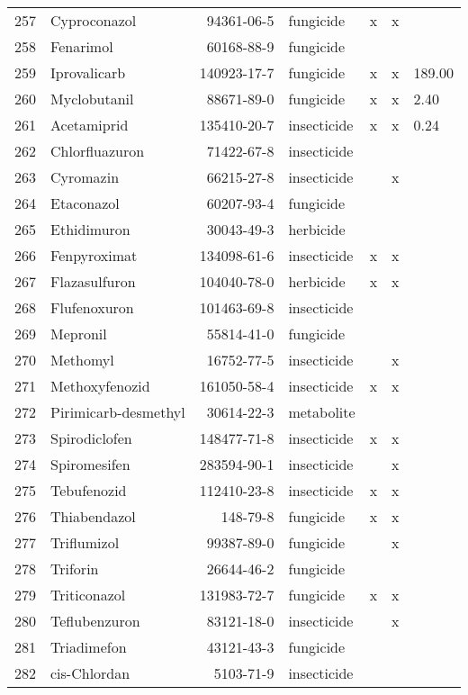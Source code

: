 \begin{longtable}{lp{3cm}rlp{0.5cm}p{0.5cm}p{1cm}}
  257 & Cyproconazol & 94361-06-5 & fungicide & x & x &  \\ 
  258 & Fenarimol & 60168-88-9 & fungicide &  &  &  \\ 
  259 & Iprovalicarb & 140923-17-7 & fungicide & x & x & 189.00 \\ 
  260 & Myclobutanil & 88671-89-0 & fungicide & x & x & 2.40 \\ 
  261 & Acetamiprid & 135410-20-7 & insecticide & x & x & 0.24 \\ 
  262 & Chlorfluazuron & 71422-67-8 & insecticide &  &  &  \\ 
  263 & Cyromazin & 66215-27-8 & insecticide &  & x &  \\ 
  264 & Etaconazol & 60207-93-4 & fungicide &  &  &  \\ 
  265 & Ethidimuron & 30043-49-3 & herbicide &  &  &  \\ 
  266 & Fenpyroximat & 134098-61-6 & insecticide & x & x &  \\ 
  267 & Flazasulfuron & 104040-78-0 & herbicide & x & x &  \\ 
  268 & Flufenoxuron & 101463-69-8 & insecticide &  &  &  \\ 
  269 & Mepronil & 55814-41-0 & fungicide &  &  &  \\ 
  270 & Methomyl & 16752-77-5 & insecticide &  & x &  \\ 
  271 & Methoxyfenozid & 161050-58-4 & insecticide & x & x &  \\ 
  272 & Pirimicarb-desmethyl & 30614-22-3 & metabolite &  &  &  \\ 
  273 & Spirodiclofen & 148477-71-8 & insecticide & x & x &  \\ 
  274 & Spiromesifen & 283594-90-1 & insecticide &  & x &  \\ 
  275 & Tebufenozid & 112410-23-8 & insecticide & x & x &  \\ 
  276 & Thiabendazol & 148-79-8 & fungicide & x & x &  \\ 
  277 & Triflumizol & 99387-89-0 & fungicide &  & x &  \\ 
  278 & Triforin & 26644-46-2 & fungicide &  &  &  \\ 
  279 & Triticonazol & 131983-72-7 & fungicide & x & x &  \\ 
  280 & Teflubenzuron & 83121-18-0 & insecticide &  & x &  \\ 
  281 & Triadimefon & 43121-43-3 & fungicide &  &  &  \\ 
  282 & cis-Chlordan & 5103-71-9 & insecticide &  &  &  \\ 

\end{longtable}
